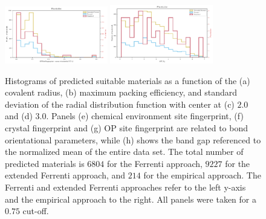 \documentclass[superscriptaddress,unsortedaddress,
 amsmath,amssymb,
 aps,
]{revtex4-2}
\begin{document}
\begin{figure}[h!]
    \includegraphics[width=0.4\textwidth]{figures/histograms/new/OPSiteFingerprint_mean tetrahedral CN_4_count_075.pdf} 
    \includegraphics[width=0.4\textwidth]{figures/histograms/new/MP_Eg_count_075.pdf} 
    \caption{Histograms of predicted suitable materials as a function of the (a) covalent radius, (b) maximum packing efficiency, and standard deviation of the radial distribution function with center at (c) $2.0$ and (d) $3.0$. Panels (e) chemical environment site fingerprint, (f) crystal fingerprint and (g) OP site fingerprint are related to bond orientational parameters, while (h) shows the band gap referenced to the normalized mean of the entire data set. The total number of predicted materials is  $6804$ for the Ferrenti approach, $9227$ for the extended Ferrenti approach, and $214$ for the empirical approach. The Ferrenti and extended Ferrenti approaches refer to the left y-axis and the empirical approach to the right. All panels were taken for a $0.75$ cut-off. }
    \label{fig:histograms_supp}
\end{figure} 

\newpage 
 
\end{document}
